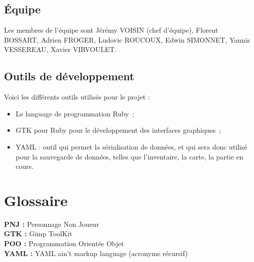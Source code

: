 \documentclass[11pt]{article}
\begin{document}
\subsection{Équipe}

Les membres de l'équipe sont Jérémy VOISIN (chef d'équipe), Florent BOSSART, Adrien FROGER, Ludovic ROUCOUX, Edwin SIMONNET, Yannis VESSEREAU, Xavier VIRVOULET.





\subsection{Outils de développement}

Voici les différents outils utilisés pour le projet :

\begin{itemize}
   \item Le language de programmation Ruby~;
   \item GTK pour Ruby pour le développement des interfaces graphiques~;
   \item YAML : outil qui permet la sérialisation de données, et qui sera donc utilisé pour la sauvegarde de données, telles que l'inventaire, la carte, la partie en cours.
\end{itemize}



\section{Glossaire}

\textbf{PNJ : }Personnage Non Joueur\\
\textbf{GTK : }Gimp ToolKit\\
\textbf{POO : }Programmation Orientée Objet\\
\textbf{YAML : }YAML ain't markup language (acronyme récursif)\\


\renewcommand{\thefootnote}{\*} %
\end{document}
